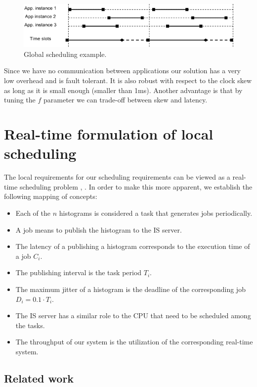 \begin{figure}[ht!]
\centering
\includegraphics[scale=0.6]{Images/local_sched.png}
\caption{Global scheduling example.}
\end{figure}

Since we have no communication between applications our solution has a very low overhead and is fault tolerant. It is also robust with respect to the clock skew as long as it is small enough (smaller than 1ms). Another advantage is that by tuning the $f$ parameter we can trade-off between skew and latency. 

\section*{Real-time formulation of local scheduling}

The local requirements for our scheduling requirements can be viewed as a real-time scheduling problem \citep{liu1973scheduling}, \citep{sha2004real}. In order to make this more apparent, we establish the following mapping of concepts:
\begin{itemize}
\item Each of the $n$ histograms is considered a task that generates jobs periodically. 
\item A job means to publish the histogram to the IS server.
\item The latency of a publishing a histogram corresponds to the execution time of a job $C_i$.
\item The publishing interval is the task period $T_i$. 
\item The maximum jitter of a histogram is the deadline of the corresponding job $D_i=0.1\cdot T_i$.
\item The IS server has a similar role to the CPU that need to be scheduled among the tasks.
\item The throughput of our system is the utilization of the corresponding real-time system.
\end{itemize}

\subsection*{Related work}

